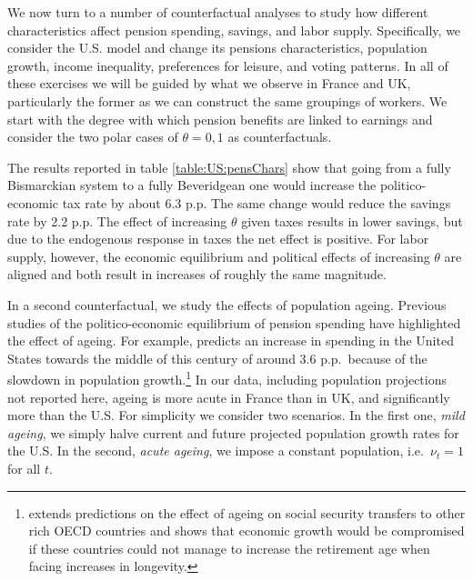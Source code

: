 


We now turn to a number of counterfactual analyses to study how different characteristics affect pension spending, savings, and labor supply. Specifically, we consider the U.S. model and change its pensions characteristics, population growth, income inequality, preferences for leisure, and voting patterns. In all of these exercises we will be guided by what we observe in France and UK, particularly the former as we can construct the same groupings of workers. We start with the degree with which pension benefits are linked to earnings and consider the two polar cases of $\theta=0,1$ as counterfactuals. 


The results reported in table \ref{table:US:pensChars} show that going from a fully Bismarckian system to a fully Beveridgean one would increase the politico-economic tax rate by about 6.3 p.p. The same change would reduce the savings rate by 2.2 p.p. The effect of increasing $\theta$ given taxes results in lower savings, but due to the endogenous response in taxes the net effect is positive. For labor supply, however, the economic equilibrium and political effects of increasing $\theta$ are aligned and both result in increases of roughly  the same magnitude.



In a second counterfactual, we study the effects of population ageing. Previous studies of the politico-economic equilibrium of pension spending have highlighted the effect of ageing. For example, \textcite{mkvss08} predicts an increase in spending in the United States towards the middle of this century of around 3.6 p.p.\ because of the slowdown in population growth.\footnote{\textcite{ssvsde15} extends predictions on the effect of ageing on social security transfers to other rich OECD countries and shows that economic growth would be compromised if these countries could not manage to increase the retirement age when facing increases in longevity.} 
In our data, including population projections not reported here, ageing is more acute in France than in UK, and significantly more than the U.S. For simplicity we consider two scenarios. In the first one, {\it mild ageing}, we simply halve current and future projected population growth rates for the U.S. In the second, {\it acute ageing}, we impose a constant population, i.e.\ $\nu_t=1$ for all $t$. 
 
